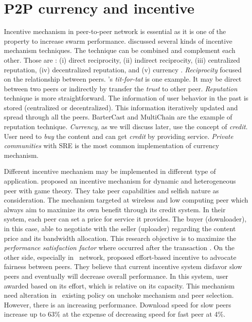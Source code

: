 \section{P2P currency and incentive}
Incentive mechanism in peer-to-peer network is essential as it is one of the property to increase swarm performance. \citeauthor{2011:managesupplydemand:meulpolder} discussed several kinds of incentive mechanism techniques. The technique can be combined and complement each other. Those are : (i) direct reciprocity, (ii) indirect reciprocity, (iii) centralized reputation, (iv) decentralized reputation, and (v) currency \cite{2011:managesupplydemand:meulpolder}. \textit{Reciprocity} focused on the relationship between peers. \bt's \textit{tit-for-tat} is one example. It may be direct between two peers or indirectly by transfer the \textit{trust} to other peer. \textit{Reputation} technique is more straightforward. The information of user behavior in the past is stored (centralized or decentralized). This information iteratively updated and spread through all the peers. BarterCast \cite{2009:bartercast:meulpolder} and MultiChain \cite{2015:multichain:norberhuis} are the example of reputation technique. \textit{Currency}, as we will discuss later, use the concept of \textit{credit}. User need to \textit{buy} the content and can get \textit{credit} by providing service. \textit{Private communities} with SRE is the most common implementation of currency mechanism.

Different incentive mechanism may be implemented in different type of application. \citeauthor{2015:incentivep2pgame:kang} proposed an incentive mechanism for dynamic and heterogeneous peer with game theory. They take peer capabilities and selfish nature as consideration. The mechanism targeted at wireless and low computing peer which always aim to maximize its own benefit through its credit system. In their system, each peer can set a price for service it provides. The buyer (downloader), in this case, able to negotiate with the seller (uploader) regarding the content price and its bandwidth allocation. This research objective is to maximize the \textit{performance satisfaction factor} where occurred after the transaction \cite{2015:incentivep2pgame:kang}. On the other side, especially in \bt~network, \citeauthor{2010:effortincentive:rahman} proposed effort-based incentive to advocate fairness between peers. They believe that current incentive system disfavor slow peers and eventually will decrease overall performance. In this system, user awarded based on its effort, which is relative on its capacity. This mechanism need alteration in \bt~existing policy on unchoke mechanism and peer selection. However, there is an increasing performance. Download speed for slow peers increase up to 63\% at the expense of decreasing speed for fast peer at 4\%.


